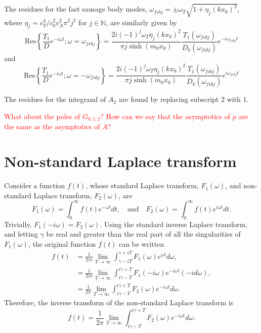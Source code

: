 \documentclass[12pt]{article}
\begin{document}
The residues for the fast sausage body modes, $\omega_{fsbj} = \pm \omega_T\sqrt{1 + \eta_j(kx_0)^2}$, where $\eta_j = c_T^4 / c_0^2v_A^2\pi^2j^2$ for $j \in \mathbb{N}$, are similarly given by
\begin{equation}
\mathrm{Res}\left\{ \frac{T_1}{D}e^{-i\omega t}; \omega = \omega_{fsbj} \right\} = \frac{2i(-1)^{j}\omega_T\eta_j(kx_0)^2}{\pi j\sinh(m_0x_0)} \frac{T_1(\omega_{fsbj})}{D_k(\omega_{fsbj})}e^{-i\omega_{fsbj}t}
\end{equation}
and
\begin{equation}
\mathrm{Res}\left\{ \frac{T_1}{D}e^{-i\omega t}; \omega = -\omega_{fsbj} \right\} = \frac{2i(-1)^{j}\omega_T\eta_j(kx_0)^2}{\pi j\sinh(m_0x_0)} \frac{T_1(\omega_{fsbj})}{D_k(\omega_{fsbj})}e^{i\omega_{fsbj}t}
\end{equation}

The residues for the integrand of $A_2$ are found by replacing subscript 2 with 1.


\textcolor{red}{What about the poles of $G_{0,1,2}$? How can we say that the asymptotics of $p$ are the same as the asymptotics of $A$?}


\appendix

\section{Non-standard Laplace transform}\label{app: laplace trans}
Consider a function $f(t)$, whose standard Laplace transform, $F_1(\omega)$, and non-standard Laplace transform, $F_2(\omega)$, are
\begin{equation}
F_1(\omega) = \int_0^\infty f(t) e^{-\omega t} dt,
\quad \text{and} \quad
F_2(\omega) = \int_0^\infty f(t) e^{i\omega t} dt.
\end{equation}
Trivially, $F_1(-i\omega) = F_2(\omega)$. Using the standard inverse Laplace transform, and letting $\gamma$ be real and greater than the real part of all the singularities of $F_1(\omega)$, the original function $f(t)$ can be written
\begin{align}
f(t) & = \frac{1}{2\pi i} \lim_{T\to\infty} \int_{\gamma - iT}^{\gamma + iT} F_1(\omega)e^{\omega t} d\omega, \\
& = \frac{1}{2\pi i} \lim_{T\to\infty} \int_{i\gamma - T}^{i\gamma + T} F_1(-i\omega)e^{-i\omega t} (-id\omega), \\
& = \frac{1}{2\pi} \lim_{T\to\infty} \int_{i\gamma - T}^{i\gamma + T} F_2(\omega)e^{-i\omega t} d\omega.
\end{align}
Therefore, the inverse transform of the non-standard Laplace transform is
\begin{equation}
f(t) = \frac{1}{2\pi} \lim_{T\to\infty} \int_{i\gamma - T}^{i\gamma + T} F_2(\omega)e^{-i\omega t} d\omega.
\end{equation}
\end{document}
